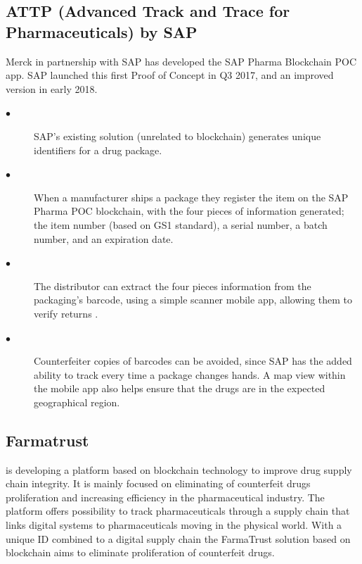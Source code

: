 \documentclass[12pt]{report}
\begin{document}
\subsection{ATTP (Advanced Track and Trace for Pharmaceuticals) by SAP}
Merck in partnership with SAP has developed the SAP Pharma Blockchain POC app. SAP launched this first Proof of Concept in Q3 2017, and an improved version in early 2018.
\begin{description}
\item[$\bullet$]SAP’s existing solution (unrelated to blockchain) generates unique identifiers for a drug package.
\item[$\bullet$]When a manufacturer ships a package they register the item on the SAP Pharma POC blockchain, with the four pieces of information generated; the item number (based on GS1 standard), a serial number, a batch number, and an expiration date.
\item[$\bullet$]The distributor can extract the four pieces information from the packaging’s barcode, using a simple scanner mobile app, allowing them to verify returns .
\item[$\bullet$]Counterfeiter copies of barcodes can be avoided, since SAP has the added ability to track every time a package changes hands. A map view within the mobile app also helps ensure that the drugs are in the expected geographical region.
\end{description}

\subsection{Farmatrust}
is developing a platform based on blockchain technology to improve drug supply chain integrity. It is mainly focused on eliminating of counterfeit drugs proliferation and increasing efficiency in the pharmaceutical industry. The platform offers possibility to track pharmaceuticals through a supply chain that links digital systems to pharmaceuticals moving in the physical world. With a unique ID combined to a digital supply chain the FarmaTrust solution based on blockchain aims to eliminate proliferation of counterfeit drugs.
 
\end{document}
